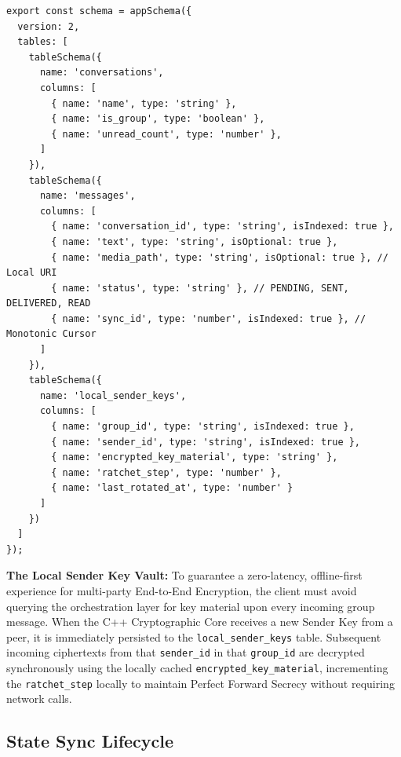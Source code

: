 \documentclass[12pt, a4paper]{article}
\begin{document}
\begin{lstlisting}[title={WatermelonDB Schema}]
export const schema = appSchema({
  version: 2,
  tables: [
    tableSchema({
      name: 'conversations',
      columns: [
        { name: 'name', type: 'string' },
        { name: 'is_group', type: 'boolean' },
        { name: 'unread_count', type: 'number' },
      ]
    }),
    tableSchema({
      name: 'messages',
      columns: [
        { name: 'conversation_id', type: 'string', isIndexed: true },
        { name: 'text', type: 'string', isOptional: true },
        { name: 'media_path', type: 'string', isOptional: true }, // Local URI
        { name: 'status', type: 'string' }, // PENDING, SENT, DELIVERED, READ
        { name: 'sync_id', type: 'number', isIndexed: true }, // Monotonic Cursor
      ]
    }),
    tableSchema({
      name: 'local_sender_keys',
      columns: [
        { name: 'group_id', type: 'string', isIndexed: true },
        { name: 'sender_id', type: 'string', isIndexed: true },
        { name: 'encrypted_key_material', type: 'string' }, 
        { name: 'ratchet_step', type: 'number' }, 
        { name: 'last_rotated_at', type: 'number' }
      ]
    })
  ]
});
\end{lstlisting}

\vspace{0.5cm}
\noindent\textbf{The Local Sender Key Vault:} To guarantee a zero-latency, offline-first experience for multi-party End-to-End Encryption, the client must avoid querying the orchestration layer for key material upon every incoming group message. When the C++ Cryptographic Core receives a new Sender Key from a peer, it is immediately persisted to the \texttt{local\_sender\_keys} table. Subsequent incoming ciphertexts from that \texttt{sender\_id} in that \texttt{group\_id} are decrypted synchronously using the locally cached \texttt{encrypted\_key\_material}, incrementing the \texttt{ratchet\_step} locally to maintain Perfect Forward Secrecy without requiring network calls.

\subsection{State Sync Lifecycle}
\end{document}
